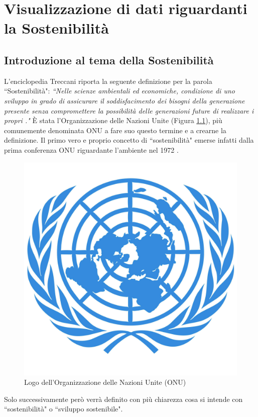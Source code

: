 \clearpage{\pagestyle{empty}\cleardoublepage}
\chapter{Visualizzazione di dati riguardanti la Sostenibilità} %
\lhead[\fancyplain{}{\bfseries\thepage}]{\fancyplain{}{\bfseries\rightmark}}
\section{Introduzione al tema della Sostenibilità}
\noindent L'enciclopedia Treccani 
riporta la seguente definizione per la parola ``Sostenibilità":
\textit{``Nelle scienze ambientali ed economiche, condizione di uno sviluppo in grado di assicurare il soddisfacimento dei bisogni della generazione presente senza compromettere la possibilità delle generazioni future di realizzare i propri \cite{treccani}."}\newline\newline
È stata l'Organizzazione delle Nazioni Unite (Figura \ref{onuImg}), più comunemente denominata ONU a fare suo questo termine e a crearne la definizione.\newline
Il primo vero e proprio concetto di ``sostenibilità" emerse infatti dalla prima conferenza ONU riguardante l'ambiente nel 1972 \cite{stoccolma}.\newline
\begin{figure}[H]
    \centering
    \includegraphics[width=0.3\linewidth]{img/onu.jpg}
    \caption{Logo dell'Organizzazione delle Nazioni Unite (ONU) \cite{onuImg}}
    \label{onuImg}
\end{figure}
\noindent Solo successivamente però verrà definito con più chiarezza cosa si intende con ``sostenibilità" o 
``sviluppo sostenibile".\newline
